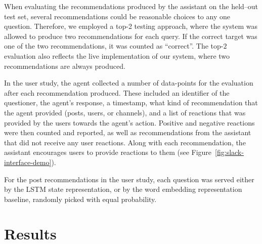 \documentclass[11pt]{article}
\newenvironment{improve}{\par\color{orange}}{\par}
\newenvironment{improve}{\par\color{black}}{\par}
\begin{document}
When evaluating the recommendations produced by the assistant on the held--out test set, several recommendations could be reasonable choices to any one question.
Therefore,
we employed a top-2 testing approach,
where the system was allowed to produce two recommendations for each query.
If the correct target was one of the two recommendations, it was counted as ``correct''. The top-$2$ evaluation also reflects the live implementation of our system, where two recommendations are always produced.

In the user study, the agent collected a number of data-points for the evaluation after each recommendation produced. These included an identifier of the questioner, the agent's response, a timestamp, what kind of recommendation that the agent provided (posts, users, or channels), and a list of reactions that was provided by the users towards the agent's action. Positive and negative reactions were then counted and reported, as well as recommendations from the assistant that did not receive any user reactions. Along with each recommendation, the assistant encourages users to provide reactions to them (see Figure~\ref{fig:slack-interface-demo}).


\begin{improve}
\end{improve}

For the post recommendations in the user study, each question was served either by the LSTM state representation, or by the word embedding representation baseline, randomly picked with equal probability.


\vfill

\section{Results}
\end{document}
